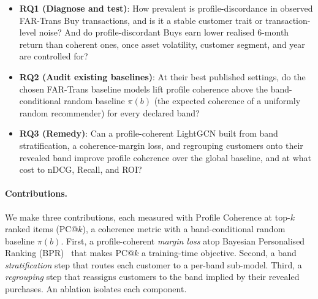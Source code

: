 \begin{itemize}
    \item \textbf{RQ1 (Diagnose and test)}: How prevalent is profile-discordance in observed FAR-Trans Buy transactions, and is it a stable customer trait or transaction-level noise? And do profile-discordant Buys earn lower realised 6-month return than coherent ones, once asset volatility, customer segment, and year are controlled for?
    \item \textbf{RQ2 (Audit existing baselines)}: At their best published settings, do the chosen FAR-Trans baseline models lift profile coherence above the band-conditional random baseline $\pi(b)$ (the expected coherence of a uniformly random recommender) for every declared band?
    \item \textbf{RQ3 (Remedy)}: Can a profile-coherent LightGCN built from band stratification, a coherence-margin loss, and regrouping customers onto their revealed band improve profile coherence over the global baseline, and at what cost to nDCG, Recall, and ROI?
\end{itemize}

\paragraph{Contributions.} We make three contributions, each measured with Profile Coherence at top-$k$ ranked items (PC@$k$), a coherence metric with a band-conditional random baseline $\pi(b)$. First, a profile-coherent \emph{margin loss} atop Bayesian Personalised Ranking (BPR)~\cite{rendle2012bprbayesianpersonalizedranking} that makes PC@$k$ a training-time objective. Second, a band \emph{stratification} step that routes each customer to a per-band sub-model. Third, a \emph{regrouping} step that reassigns customers to the band implied by their revealed purchases. An ablation isolates each component.
